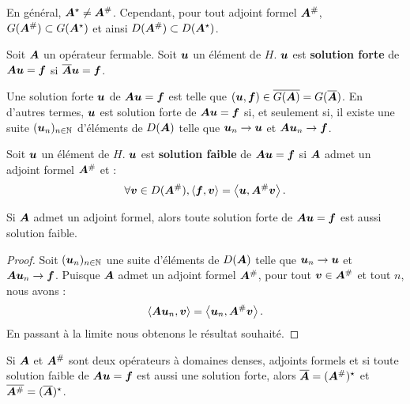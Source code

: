 \begin{remark}
	En général, $\bm{A}^\star \neq \bm{A}^{\#}$. Cependant,
	pour tout adjoint formel $\bm{A}^{\#}$, $G(\bm{A}^{\#}) \subset G(\bm{A}^\star)$
	et ainsi $D(\bm{A}^{\#}) \subset D(\bm{A}^\star)$.
\end{remark}

\begin{definition}
	Soit $\bm{A}$ un opérateur fermable. Soit $\bm{u}$ un élément de $H$.
	$\bm{u}$ est \textbf{solution forte} de $\bm{A} \bm{u} = \bm{f}$ si
	$\overline{\bm{A}} \bm{u} = \bm{f}$.
\end{definition}

Une solution forte $\bm{u}$ de $\bm{A} \bm{u} = \bm{f}$ est telle que
$(\bm{u},\bm{f}) \in \overline{G(\bm{A})} = G(\overline{\bm{A}})$.
En d'autres termes, $\bm{u}$ est solution forte de $\bm{A} \bm{u} = \bm{f}$
si, et seulement si, il existe une suite
$(\bm{u}_n)_{n \in \mathbb{N}}$ d'éléments de $D(\bm{A})$
telle que $\bm{u}_n \rightarrow \bm{u}$ et $\bm{A} \bm{u}_n \rightarrow \bm{f}$.

\begin{definition}
	Soit $\bm{u}$ un élément de $H$.
	$\bm{u}$ est \textbf{solution faible} de $\bm{A} \bm{u} = \bm{f}$
	si $\bm{A}$ admet un adjoint formel $\bm{A}^{\#}$
	et :
	\begin{align}
		\forall \bm{v} \in D(\bm{A}^{\#}),
		\left\langle \bm{f} , \bm{v} \right\rangle =
		\left\langle \bm{u} , \bm{A}^{\#} \bm{v} \right\rangle .
	\end{align}
\end{definition}

\begin{proposition}
	Si $\bm{A}$ admet un adjoint formel, alors toute solution forte
	de $\bm{A} \bm{u} = \bm{f}$ est aussi solution faible.
\end{proposition}

\begin{proof}
	Soit $(\bm{u}_n)_{n \in \mathbb{N}}$ une suite d'éléments de $D(\bm{A})$
	telle que $\bm{u}_n \rightarrow \bm{u}$ et $\bm{A} \bm{u}_n \rightarrow \bm{f}$.
	Puisque $\bm{A}$ admet un adjoint formel $\bm{A}^{\#}$, pour tout
	$\bm{v} \in \bm{A}^{\#}$ et tout $n$, nous avons :
	\begin{align}
		\left\langle \bm{A} \bm{u}_n , \bm{v} \right\rangle =
		\left\langle \bm{u}_n , \bm{A}^{\#} \bm{v} \right\rangle .
	\end{align}
	En passant à la limite nous obtenons le résultat souhaité.
\end{proof}

\begin{proposition}
	Si $\bm{A}$ et $\bm{A}^{\#}$ sont deux opérateurs à domaines denses,
	adjoints formels et si toute solution faible de $\bm{A} \bm{u} = \bm{f}$
	est aussi une solution forte, alors $\overline{\bm{A}} = (\bm{A}^{\#})^\star$
	et $\overline{\bm{A}^{\#}} = (\overline{\bm{A}})^\star$.
\end{proposition}

